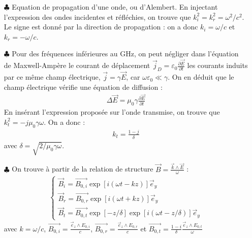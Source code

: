 \documentclass{report}
\begin{document}
\begin{itemize}
	
	\item[$\clubsuit$] Equation de propagation d'une onde, ou d'Alembert. En injectant l'expression des ondes incidentes et réfléchies, on trouve que $k_i^2=k_r^2=\omega^2/c^2$. Le signe est donné par la direction de propagation : on a donc $k_i=\omega/c$ et $k_r=-\omega/c$.
	
	\item[$\clubsuit$] Pour des fréquences inférieures au GHz, on peut négliger dans l'équation de Maxwell-Ampère le courant de déplacement $\vec{j}_D=\varepsilon_0\frac{\partial \vec{E}}{\partial t}$ les courants induits par ce même champ électrique, $\vec{j}=\gamma\vec{E}$, car $\omega\varepsilon_0\ll\gamma$. On en déduit que le champ électrique vérifie une équation de diffusion :
	\begin{align*}
		\Delta \vec{E}=\mu_0\gamma\frac{\partial \vec{E}}{\partial t}
	\end{align*}
	En insérant l'expression proposée sur l'onde transmise, on trouve que $k_t^2=-j\mu_0\gamma\omega$. On a donc :
	\begin{align*}
		k_t = \frac{1-j}{\delta}
	\end{align*}
	avec $\delta=\sqrt{2/\mu_0\gamma\omega}$.
	
	\item[$\clubsuit$] On trouve à partir de la relation de structure $\vec{B}=\frac{\vec{k}\wedge\vec{E}}{\omega}$ :
	\begin{align}
    \begin{cases}
        \vec{B}_i=\vec{B_{0,i}}\exp[i(\omega t-kz)]\vec{e}_y\\
     	\vec{B}_r=\vec{B_{0,r}}\exp[i(\omega t+kz)]\vec{e}_y\\
     	\vec{B}_t=\vec{B_{0,t}}\exp[-z/\delta]\exp[i(\omega t-z/\delta)]\vec{e}_y
    \end{cases}  
	\end{align}
	avec $k=\omega/c$, $\vec{B_{0,i}}=\frac{\vec{e}_z\wedge E_{0,i}}{c}$, $\vec{B_{0,r}}=\frac{\vec{e}_z\wedge E_{0,r}}{c}$ et $\vec{B_{0,t}}=\frac{1-i}{\delta}\frac{\vec{e}_z\wedge E_{0,t}}{\omega}$
	

\end{itemize}
\end{document}
